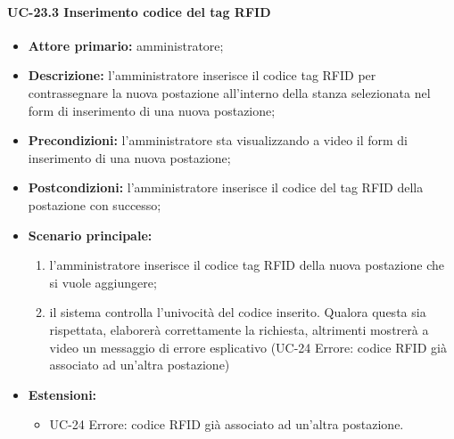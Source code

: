  \paragraph{UC-23.3 Inserimento codice del tag RFID}
 \begin{itemize}
	\item \textbf{Attore primario:} amministratore;
	\item \textbf{Descrizione:} l'amministratore inserisce il codice tag RFID per contrassegnare la nuova postazione all'interno della stanza selezionata nel form di inserimento di una nuova postazione;
	\item \textbf{Precondizioni:} l'amministratore sta visualizzando a video il form di inserimento di una nuova postazione;
	\item \textbf{Postcondizioni:} l'amministratore inserisce il codice del tag RFID della postazione con successo;
	\item \textbf{Scenario principale:}
	      \begin{enumerate}
		      \item l'amministratore inserisce il codice tag RFID della nuova postazione che si vuole aggiungere;
		      \item il sistema controlla l'univocità del codice inserito. Qualora questa sia rispettata, elaborerà correttamente la richiesta, altrimenti mostrerà a video un messaggio di errore esplicativo (UC-24 Errore: codice RFID già associato ad un'altra postazione)
	      \end{enumerate}
	      \item \textbf{Estensioni:}
		\begin{itemize}
		      \item UC-24 Errore: codice RFID già associato ad un'altra postazione.
	      \end{itemize}
\end{itemize}

